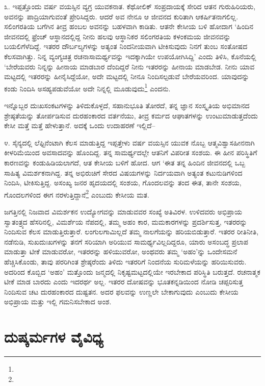೩. ಇಪ್ಪತ್ತೊಂದು ವರ್ಷ ವಯಸ್ಸಿನ ವ್ಯಗ್ರ ಯುವಕನಾತ. ಕೆಥೋಲಿಕ್ ಸಂಪ್ರದಾಯಕ್ಕೆ ಸೇರಿದ ಆತನ ಗುರುಹಿರಿಯರು, ಅವನನ್ನು ಪಾದ್ರಿಯಾಗುವಂತೆ ಪ್ರೇರಿಸಿದ್ದರು. ಆದರೆ ಅವ ನೇನೂ ಆ ಜೀವನದ ಕುರಿತಾಗಿ ಆಕರ್ಷಿತನಾಗಲಿಲ್ಲ. ಸಲಿಂಗರತಿಯ ಬಗೆಗಿನ ತೀವ್ರ ಹಂಬಲ ಅವನನ್ನು ಬಹಳವಾಗಿ ಕಾಡಿತು. ಆತನೇ ಕೇಸೀಯ ಬಳಿ ಹೋದಾಗ ‘ಹಿಂದಿನ ಜೀವನದಲ್ಲಿ ಫ್ರೆಂಚ್ ಆಸ್ಥಾನದಲ್ಲಿದ್ದ ನೀನು ಹಲವು ಆಸ್ಥಾನಿಕರ ಸಲಿಂಗರತಿಯ ಕಳಂಕಮಯ ಜೀವನವನ್ನು ಬಯಲಿಗೆಳೆದಿದ್ದೆ. ಇತರರ ದೌರ್ಬಲ್ಯಗಳನ್ನು ಅತ್ಯಂತ ನಿಂದನೀಯವಾಗಿ ಟೀಕಿಸುವುದು ನಿನಗೆ ತುಂಬ ಸಂತೋಷದ ಕೆಲಸವಾಗಿತ್ತು. ನಿನ್ನ ವ್ಯಂಗ್ಯಚಿತ್ರ ರಚನಾಸಾಮರ್ಥ್ಯವನ್ನು ಇದಕ್ಕಾಗಿಯೇ ಉಪಯೋಗಿಸಿದ್ದಿ’ ಎಂದು ತಿಳಿಸಿ, ಕೊನೆಯಲ್ಲಿ ‘ಬೇರೆಯವರು ನಿನ್ನನ್ನು ಹೀನಾಯ ಮಾಡಬಾರ ದೆಂದಿದ್ದರೆ ನೀನು ಇತರರನ್ನು ಹೀನಾಯ ಮಾಡಬೇಡ. ನೀನು ಯಾವ ಮಟ್ಟದಲ್ಲಿ ಇತರರನ್ನು ಹೀನೈಸಿದ್ದೆಯೋ, ಅದೇ ಮಟ್ಟದಲ್ಲಿ ನೀನೂ ನಿಂದಿಸಲ್ಪಡುವೆ ಬೇರೆಯವರಿಂದ. ಯಾವುದನ್ನು ಕಂಡು ನಿಂದಿಸಿ ಅಸಹ್ಯಪಡುವೆಯೋ ಅದೇ ನಿನ್ನಲ್ಲಿ ಮೂಡುವುದು\footnote{} ಎಂದನು.

ಇನ್ನೊಬ್ಬರ ದುಃಖಸಂಕಟಗಳನ್ನು ತಿಳಿದುಕೊಳ್ಳದೆ, ಸಹಾನುಭೂತಿ ತೋರದೆ, ತನ್ನ ಜ್ಞಾನ ಸಂಸ್ಕೃತಿಯ ಅಭಿಮಾನದ ಶ್ರೇಷ್ಠತೆಯನ್ನು ತೋರ್ಪಡಿಸುವ ದುರಹಂಕಾರದ ವರ್ತನೆಯು, ತೀವ್ರ ಕರ್ಮದ ಆಘಾತಗಳನ್ನು ಉಂಟುಮಾಡುತ್ತದೆಂದು ಕೇಸೀ ಮತ್ತೆ ಮತ್ತೆ ಹೇಳುತ್ತಾನೆ. ಅದಕ್ಕೆ ಒಂದು ಉದಾಹರಣೆ ಇಲ್ಲಿದೆ–

೪. ಸೈನ್ಯದಲ್ಲಿ ಲೆಫ್ಟಿನೆಂಟಾಗಿ ಕೆಲಸ ಮಾಡುತ್ತಿದ್ದ ಇಪ್ಪತ್ತೇಳು ವರ್ಷ ವಯಸ್ಸಿನ ಯುವಕ ನೊಬ್ಬ ಆತ್ಮವಿಶ್ವಾಸಹೀನನಾಗಿ ಕೀಳರಿಮೆಯಿಂದ ಅವಸಾದವನ್ನು ಹೊಂದಿದ್ದ. ತನ್ನ ಸಾಮರ್ಥ್ಯದಲ್ಲೇ ಆತನಿಗೆ ವಿಪರೀತ ಸಂಶಯ. ಈ ಹೀನ ಪರಿಸ್ಥಿತಿಗೆ ಕಾರಣವನ್ನು ಕಂಡುಹಿಡಿಯಲಾಗದೆ, ಆತ ಕೇಸೀಯ ಬಳಿಗೆ ಹೋದ. ಆಗ ‘ಈತ ತನ್ನ ಹಿಂದಿನ ಜೀವನದಲ್ಲಿ ಒಬ್ಬ ಸಾಹಿತ್ಯ ವಿಮರ್ಶಕನಾಗಿದ್ದ. ತನ್ನ ಅಭಿರುಚಿಗೆ ಸೇರದ ವಿಷಯಗಳನ್ನು ನಿರ್ದಯವಾಗಿ ಅತ್ಯಂತ ಕಟುನುಡಿಗಳಿಂದ ನಿಂದಿಸಿ, ಟೀಕಿಸುತ್ತಿದ್ದ. ಅಸಂಖ್ಯ ಜನರ ಹೃದಯದಲ್ಲಿ ಸಂಶಯ, ಗೊಂದಲವನ್ನು ತಂದ ಈತ, ತಾನೇ ಸಂಶಯ, ಗೊಂದಲಗಳಿಂದ ಈಗ ನರಳುತ್ತಿದ್ದಾನೆ\footnote{} ಎಂಬುದು ಕೇಸೀಯ ಮತ.

ಜಗತ್ತಿನಲ್ಲಿ ನಿಜವಾದ ವಿಮರ್ಶಕನ ಉದ್ಯೋಗವನ್ನು ಮಾಡುವವರ ಸಂಖ್ಯೆ ಅತಿವಿರಳ. ಉಳಿದವರು ಅಭಿಪ್ರಾಯ ಸ್ವಾತಂತ್ರ್ಯದ ಹೆಸರಿನಲ್ಲಿ, ವಿಮರ್ಶೆಯ ನೆಪದಲ್ಲಿ, ತಮ್ಮ ಅಹಂ ಕಾರ, ಮಮಕಾರಗಳನ್ನು ಪ್ರದರ್ಶಿಸುತ್ತ, ಇತರರನ್ನು ನಿಂದಿಸುವ ಕೆಲಸ ಮಾಡುತ್ತಿರುತ್ತಾರೆ. ಲಂಗುಲಗಾಮಿಲ್ಲದೆ ತಮ್ಮ ನಾಲಗೆಯನ್ನು ಹರಿಯಬಿಡುತ್ತಾರೆ. ಇತರರ ರೀತಿನೀತಿ, ನಡೆನುಡಿ, ಸುಖದುಃಖಗಳನ್ನು ತನಗೆ ಸರಿಯಾಗಿ ಅರಿಯುವ ಸಾಮರ್ಥ್ಯವಿಲ್ಲದಿದ್ದರೂ, ಯಾರು ಅಸಂಬದ್ಧ ಪ್ರಲಾಪ ಮಾಡುತ್ತಾ ಟೀಕೆ ಮಾಡುವರೋ, ಇತರರನ್ನು ಹಳಿಯುವರೋ, ಅಂಥವರು ತಮ್ಮ ‘ಅಹಂ’ನ್ನು ಒಂದೇಸಮನೆ ಹೆಚ್ಚಿಸಿಕೊಂಡು, ತಾವು ಪರರಿಗಿಂತ ಶ್ರೇಷ್ಠರೆಂದು ತಿಳಿದು ಇತರರಿಗೆ ನಿಂದನೆಯ ಸುರಿಮಳೆಯನ್ನು ಹರಿಯಿಸುವರು. ಅದರಿಂದ ಕೊಬ್ಬಿದ ‘ಅಹಂ’ ಮತ್ತೊಂದು ಜನ್ಮದಲ್ಲಿ ನಿಕೃಷ್ಟಮಟ್ಟದಲ್ಲಿಯೇ ಇರಬೇಕಾದ ಪರಿಸ್ಥಿತಿ ಬರುತ್ತದೆ. ರಚನಾತ್ಮಕ ಟೀಕೆ ಮಾಡ ಬಾರದು ಎಂದು ಇದರರ್ಥ ಅಲ್ಲ. ಇತರರ ದೋಷವನ್ನು ಭೂತಕನ್ನಡಿಯಿಂದ ನೋಡಿ ಚಪ್ಪರಿಸುತ್ತ ನಿಂದಿಸುವ ಚಟ ದುರಹಂಕಾರದ ದುಷ್ಟತನ. ಅದರ ಫಲವನ್ನು ಉಣ್ಣಲೇ ಬೇಕಾಗುವುದು ಎಂಬುದು ಕೇಸೀಯ ಅಭಿಪ್ರಾಯ ಮತ್ತು ಇಲ್ಲಿ ಗಮನಿಸಬೇಕಾದ ಅಂಶ.


\section{ದುಷ್ಕರ್ಮಗಳ ವೈವಿಧ್ಯ}

